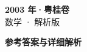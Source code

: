 \documentclass[zihao=-4, a4paper]{ctexart}
\begin{document}
\begin{center}
  {\Large\bfseries 2003 年·粤桂卷}\\[4pt]
  {\large 数学 · 解析版}
\end{center}
\medskip
{}

\clearpage
{}
\begin{center}{\Large\bfseries 参考答案与详细解析}\end{center}
\medskip

\end{document}
